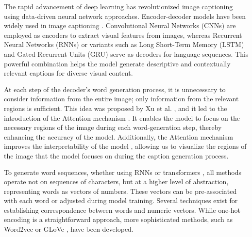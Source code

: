 \documentclass[conference]{IEEEtran}
\begin{document}
The rapid advancement of deep learning \cite{krizhevsky2017imagenet, bengio2013representation, lecun2015deep} has revolutionized image captioning using data-driven neural network approaches. %
Encoder-decoder models have been widely used in image captioning \cite{xiao2019deep}. Convolutional Neural Networks (CNNs) \cite{kim2014convolutional, lecun1995convolutional, Atliha2020} are employed as encoders to extract visual features from images, whereas Recurrent Neural Networks (RNNs) \cite{pascanu2013construct} or variants such as Long Short-Term Memory (LSTM) \cite{karpathy2015visualizing} and Gated Recurrent Units (GRU) \cite{do2020reference} serve as decoders for language sequences. This powerful combination helps the model generate descriptive and contextually relevant captions for diverse visual content.


At each step of the decoder's word generation process, it is unnecessary to consider information from the entire image; only information from the relevant regions is sufficient. This idea was proposed by Xu et al. \cite{xu2015show}, and it led to the introduction of the Attention mechanism \cite{niu2021review}. It enables the model to focus on the necessary regions of the image during each word-generation step, thereby enhancing the accuracy of the model. Additionally, the Attention mechanism improves the interpretability of the model \cite{gao2021interpretable}, allowing us to visualize the regions of the image that the model focuses on during the caption generation process.




To generate word sequences, whether using RNNs or transformers \cite{vaswani2017attention}, all methods operate not on sequences of characters, but at a higher level of abstraction, representing words as vectors of numbers. These vectors can be pre-associated with each word or adjusted during model training. Several techniques exist for establishing correspondence between words and numeric vectors. While one-hot encoding \cite{rodriguez2018beyond} is a straightforward approach, more sophisticated methods, %
such as Word2vec \cite{mikolov2013efficient} or GLoVe \cite{pennington2014GLoVe}, have been developed.
\end{document}
